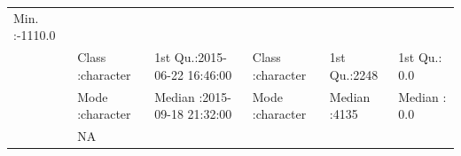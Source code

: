 \documentclass[]{article}
\begin{document}
\begin{longtable}[]{@{}llllll@{}}
\begin{minipage}[t]{0.14\columnwidth}
Min. :-1110.0\strut
\end{minipage}\tabularnewline
\begin{minipage}[t]{0.03\columnwidth}\raggedright\strut
\strut
\end{minipage} & \begin{minipage}[t]{0.15\columnwidth}\raggedright\strut
Class :character\strut
\end{minipage} & \begin{minipage}[t]{0.24\columnwidth}\raggedright\strut
1st Qu.:2015-06-22 16:46:00\strut
\end{minipage} & \begin{minipage}[t]{0.15\columnwidth}\raggedright\strut
Class :character\strut
\end{minipage} & \begin{minipage}[t]{0.12\columnwidth}\raggedright\strut
1st Qu.:2248\strut
\end{minipage} & \begin{minipage}[t]{0.14\columnwidth}\raggedright\strut
1st Qu.: 0.0\strut
\end{minipage}\tabularnewline
\begin{minipage}[t]{0.03\columnwidth}\raggedright\strut
\strut
\end{minipage} & \begin{minipage}[t]{0.15\columnwidth}\raggedright\strut
Mode :character\strut
\end{minipage} & \begin{minipage}[t]{0.24\columnwidth}\raggedright\strut
Median :2015-09-18 21:32:00\strut
\end{minipage} & \begin{minipage}[t]{0.15\columnwidth}\raggedright\strut
Mode :character\strut
\end{minipage} & \begin{minipage}[t]{0.12\columnwidth}\raggedright\strut
Median :4135\strut
\end{minipage} & \begin{minipage}[t]{0.14\columnwidth}\raggedright\strut
Median : 0.0\strut
\end{minipage}\tabularnewline
\begin{minipage}[t]{0.03\columnwidth}\raggedright\strut
\strut
\end{minipage} & \begin{minipage}[t]{0.15\columnwidth}\raggedright\strut
NA\strut
\end{minipage} & \begin{minipage}[t]{0.24\columnwidth}\raggedright\strut

\end{minipage}
\end{longtable}
\end{document}
